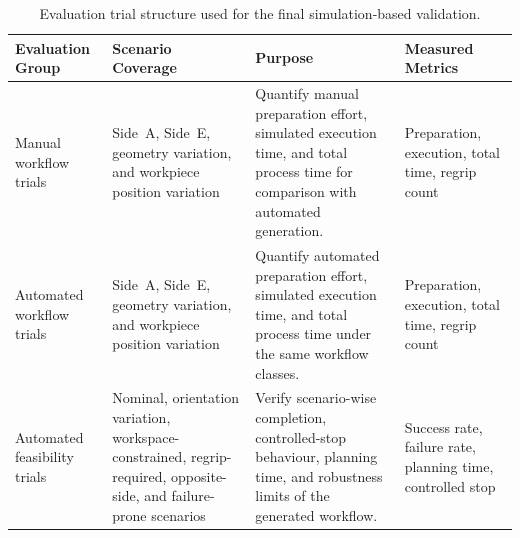 \begin{table}[htbp]
\centering
\normalsize
\setlength{\tabcolsep}{3pt}
\renewcommand{\arraystretch}{1.12}
\begin{tabularx}{\textwidth}{
L{3.0cm}
L{3.4cm}
Y
L{3.0cm}
}
\hline
\textbf{Evaluation Group} &
\textbf{Scenario Coverage} &
\textbf{Purpose} &
\textbf{Measured Metrics} \\
\hline

Manual workflow trials &
Side~A, Side~E, geometry variation, and workpiece position variation &
Quantify manual preparation effort, simulated execution time, and total process time for comparison with automated generation. &
Preparation, execution, total time, regrip count \\
\hline

Automated workflow trials &
Side~A, Side~E, geometry variation, and workpiece position variation &
Quantify automated preparation effort, simulated execution time, and total process time under the same workflow classes. &
Preparation, execution, total time, regrip count \\
\hline

Automated feasibility trials &
Nominal, orientation variation, workspace-constrained, regrip-required, opposite-side, and failure-prone scenarios &
Verify scenario-wise completion, controlled-stop behaviour, planning time, and robustness limits of the generated workflow. &
Success rate, failure rate, planning time, controlled stop \\

\hline
\end{tabularx}
\caption{Evaluation trial structure used for the final simulation-based validation.}
\label{tab:manual-vs-auto-trial-structure}
\end{table}

\FloatBarrier
